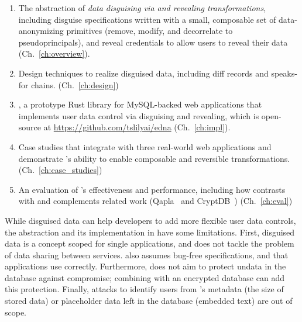 \begin{enumerate}[nosep]
    \item The abstraction of \emph{data disguising via \xxing and revealing
        transformations}, including 
        disguise specifications written with a small, composable set of
        data-anonymizing primitives (remove, modify, and decorrelate to
        pseudoprincipals), and reveal credentials to allow users
        to reveal their data (Ch.~\ref{ch:overview}).

    \item Design techniques to realize disguised data, including diff records and speaks-for chains.
        (Ch.~\ref{ch:design})

    \item \sys, a prototype Rust library for MySQL-backed web applications that
        implements user data control via disguising and revealing, which is
        open-source at
        \url{https://github.com/tslilyai/edna} (Ch.~\ref{ch:impl}).

    \item Case studies that integrate \sys with three real-world web
    applications and demonstrate \sys's ability to enable composable and
        reversible transformations. (Ch.~\ref{ch:case_studies})

    \item An evaluation of \sys's effectiveness and performance, including how
    \sys contrasts with and complements related work (Qapla~\cite{qapla} and
        CryptDB~\cite{cryptdb}) (Ch.~\ref{ch:eval}) 
\end{enumerate}
%

%
While disguised data can help developers to add more flexible user data
controls, the abstraction and its implementation in \sys have some limitations. 
%
First, disguised data is a concept scoped for single applications, and does not
tackle the problem of data sharing between services.
%
%
\sys also assumes bug-free \xx specifications, and that applications use \sys
correctly.
%
Furthermore, \sys does not aim to protect un\xxed data in the database against compromise;
combining \sys with an encrypted database can add this protection.
%
Finally, attacks to identify users from \sys's metadata (\eg the size of
stored \xxed data) or placeholder data left in the database (\eg embedded text)
are out of scope.
%



